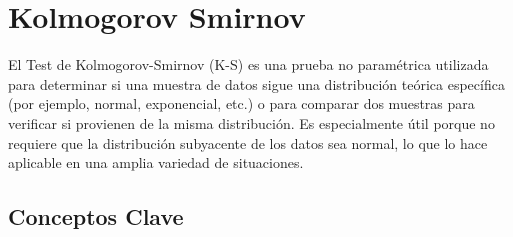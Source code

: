 \documentclass[
  us-letterpaper,
]{scrreprt}
\theoremstyle{plain}
\theoremstyle{plain}
\theoremstyle{definition}
\theoremstyle{remark}
\begin{document}
\section{Kolmogorov Smirnov}\label{sec-K_S}

El Test de Kolmogorov-Smirnov (K-S) es una prueba no paramétrica
utilizada para determinar si una muestra de datos sigue una distribución
teórica específica (por ejemplo, normal, exponencial, etc.) o para
comparar dos muestras para verificar si provienen de la misma
distribución. Es especialmente útil porque no requiere que la
distribución subyacente de los datos sea normal, lo que lo hace
aplicable en una amplia variedad de situaciones.

\subsection{Conceptos Clave}\label{conceptos-clave-1}
\end{document}
